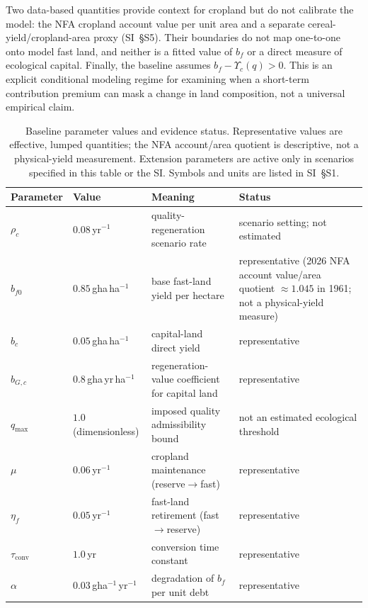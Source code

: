 \documentclass[preprint,12pt,authoryear]{elsarticle}
\newcommand{\Ups}{\Upsilon_c}
\newcommand{\tconv}{\tau_{\mathrm{conv}}}
\begin{document}
Two data-based quantities provide context for cropland but do not calibrate the model: the NFA cropland account value per unit area and a separate cereal-yield/cropland-area proxy (SI~\S S5). Their boundaries do not map one-to-one onto model fast land, and neither is a fitted value of $b_f$ or a direct measure of ecological capital. Finally, the baseline assumes $b_f-\Ups(q)>0$. This is an explicit conditional modeling regime for examining when a short-term contribution premium can mask a change in land composition, not a universal empirical claim.

\begin{table}[!htbp]
\centering\footnotesize
\renewcommand{\arraystretch}{0.95}
\caption{Baseline parameter values and evidence status. Representative values are effective, lumped quantities; the NFA account/area quotient is descriptive, not a physical-yield measurement. Extension parameters are active only in scenarios specified in this table or the SI. Symbols and units are listed in SI~\S S1.}
\label{tab:params}
\setlength{\tabcolsep}{4pt}
\begin{tabularx}{\textwidth}{@{}>{\raggedright\arraybackslash}p{} >{\raggedright\arraybackslash}p{} >{\raggedright\arraybackslash}X >{\raggedright\arraybackslash}p{}@{}}
\toprule
Parameter & Value & Meaning & Status \\
\midrule
$\rho_c$ & $0.08$\,yr$^{-1}$ & quality-regeneration scenario rate & scenario setting; not estimated \\
$b_{f0}$ & $0.85$\,gha\,ha$^{-1}$ & base fast-land yield per hectare & representative (2026 NFA account value/area quotient $\approx1.045$ in 1961; not a physical-yield measure) \\
$b_c$ & $0.05$\,gha\,ha$^{-1}$ & capital-land direct yield & representative \\
$b_{G,c}$ & $0.8$\,gha\,yr\,ha$^{-1}$ & regeneration-value coefficient for capital land & representative \\
$q_{\max}$ & $1.0$ (dimensionless) & imposed quality admissibility bound & not an estimated ecological threshold \\
$\mu$ & $0.06$\,yr$^{-1}$ & cropland maintenance (reserve$\to$fast) & representative \\
$\eta_f$ & $0.05$\,yr$^{-1}$ & fast-land retirement (fast$\to$reserve) & representative \\
$\tconv$ & $1.0$\,yr & conversion time constant & representative \\
$\alpha$ & $0.03$\,gha$^{-1}$\,yr$^{-1}$ & degradation of $b_f$ per unit debt & representative \\

\end{tabularx}
\end{table}
\end{document}
